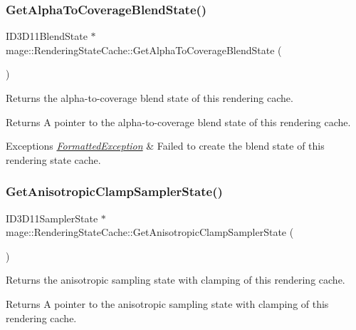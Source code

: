 \subsubsection{\texorpdfstring{Get\+Alpha\+To\+Coverage\+Blend\+State()}{GetAlphaToCoverageBlendState()}}
{\footnotesize\ttfamily I\+D3\+D11\+Blend\+State $\ast$ mage\+::\+Rendering\+State\+Cache\+::\+Get\+Alpha\+To\+Coverage\+Blend\+State (\begin{DoxyParamCaption}{ }\end{DoxyParamCaption})}

Returns the alpha-\/to-\/coverage blend state of this rendering cache.

\begin{DoxyReturn}{Returns}
A pointer to the alpha-\/to-\/coverage blend state of this rendering cache. 
\end{DoxyReturn}

\begin{DoxyExceptions}{Exceptions}
{\em \hyperlink{structmage_1_1_formatted_exception}{Formatted\+Exception}} & Failed to create the blend state of this rendering state cache. \\
\hline
\end{DoxyExceptions}
\hypertarget{structmage_1_1_rendering_state_cache_ad4b0894beba4725e53a5a7ca3b9085cb}{}\label{structmage_1_1_rendering_state_cache_ad4b0894beba4725e53a5a7ca3b9085cb} 
\subsubsection{\texorpdfstring{Get\+Anisotropic\+Clamp\+Sampler\+State()}{GetAnisotropicClampSamplerState()}}
{\footnotesize\ttfamily I\+D3\+D11\+Sampler\+State $\ast$ mage\+::\+Rendering\+State\+Cache\+::\+Get\+Anisotropic\+Clamp\+Sampler\+State (\begin{DoxyParamCaption}{ }\end{DoxyParamCaption})}

Returns the anisotropic sampling state with clamping of this rendering cache.

\begin{DoxyReturn}{Returns}
A pointer to the anisotropic sampling state with clamping of this rendering cache. 
\end{DoxyReturn}


